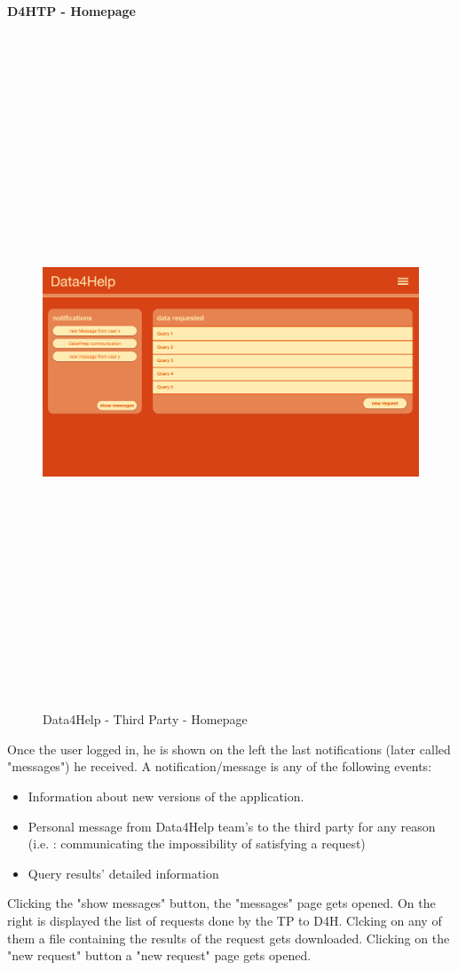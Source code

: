 \paragraph{D4HTP - Homepage}
\begin{figure}[H]
    \includegraphics[width=.6\linewidth, height = 20cm, keepaspectratio]{./Images/Mockups/Data4Help/D4HTP/D4HTP_HomePage.png}
    \centering
    \caption{Data4Help - Third Party - Homepage}
    \label{fig:sab}
  \end{figure}
Once the user logged in, he is shown on the left the last notifications (later called "messages") he received. A notification/message is any of the following events:
\begin{itemize}
		\item Information about new versions of the application.
		\item Personal message from Data4Help team's to the third party for any reason (i.e. : communicating the impossibility of satisfying a request)
    \item Query results' detailed information
\end{itemize}
Clicking the "show messages" button, the "messages" page gets opened. 
On the right is displayed the list of requests done by the TP to D4H.
Clcking on any of them a file containing the results of the request gets downloaded.
Clicking on the "new request" button a "new request" page gets opened.




